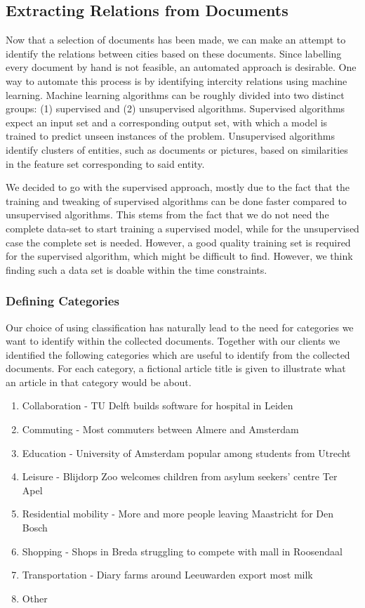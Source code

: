 \subsection{Extracting Relations from Documents}
Now that a selection of documents has been made, we can make an attempt to identify the relations between cities based on these documents. Since labelling every document by hand is not feasible, an automated approach is desirable. 
One way to automate this process is by identifying intercity relations using machine learning. Machine learning algorithms can be roughly divided into two distinct groups: (1) supervised and (2) unsupervised algorithms. Supervised algorithms expect an input set and a corresponding output set, with which a model is trained to predict unseen instances of the problem. Unsupervised algorithms identify clusters of entities, such as documents or pictures, based on similarities in the feature set corresponding to said entity.

We decided to go with the supervised approach, mostly due to the fact that the training and tweaking of supervised algorithms can be done faster compared to unsupervised algorithms. This stems from the fact that we do not need the complete data-set to start training a supervised model, while for the unsupervised case the complete set is needed. However, a good quality training set is required for the supervised algorithm, which might be difficult to find. However, we think finding such a data set is doable within the time constraints.

\subsubsection{Defining Categories}
Our choice of using classification has naturally lead to the need for categories we want to identify within the collected documents. Together with our clients we identified the following categories which are useful to identify from the collected documents. For each category, a fictional article title is given to illustrate what an article in that category would be about.\\

\begin{enumerate}
    \item Collaboration - TU Delft builds software for hospital in Leiden
    \item Commuting - Most commuters between Almere and Amsterdam
    \item Education - University of Amsterdam popular among students from Utrecht
    \item Leisure - Blijdorp Zoo welcomes children from asylum seekers' centre Ter Apel
    \item Residential mobility - More and more people leaving Maastricht for Den Bosch
    \item Shopping - Shops in Breda struggling to compete with mall in Roosendaal
    \item Transportation - Diary farms around Leeuwarden export most milk
    \item Other
\end{enumerate}

